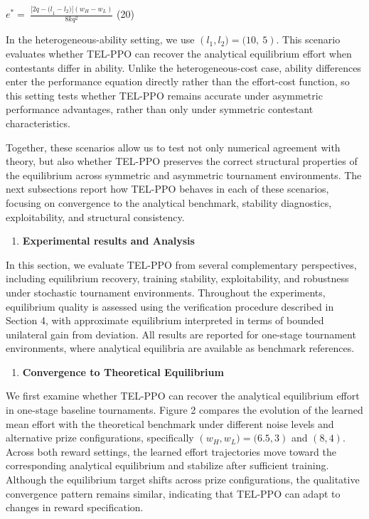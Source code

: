 \documentclass[
]{article}
\begin{document}
\(e^{*} = \ \frac{\lbrack 2q - {(l}_{1} - l_{2})\rbrack(w_{H} - w_{L})}{8kq^{2}}\)
(20)

In the heterogeneous-ability setting, we use
\(\left( l_{1},l_{2}) = (10,\ 5 \right).\) This scenario evaluates
whether TEL-PPO can recover the analytical equilibrium effort when
contestants differ in ability. Unlike the heterogeneous-cost case,
ability differences enter the performance equation directly rather than
the effort-cost function, so this setting tests whether TEL-PPO remains
accurate under asymmetric performance advantages, rather than only under
symmetric contestant characteristics.

Together, these scenarios allow us to test not only numerical agreement
with theory, but also whether TEL-PPO preserves the correct structural
properties of the equilibrium across symmetric and asymmetric tournament
environments. The next subsections report how TEL-PPO behaves in each of
these scenarios, focusing on convergence to the analytical benchmark,
stability diagnostics, exploitability, and structural consistency.

\begin{enumerate}
\def\labelenumi{\arabic{enumi}.}
\setcounter{enumi}{2}
\item
  \textbf{Experimental results and Analysis}
\end{enumerate}

In this section, we evaluate TEL-PPO from several complementary
perspectives, including equilibrium recovery, training stability,
exploitability, and robustness under stochastic tournament environments.
Throughout the experiments, equilibrium quality is assessed using the
verification procedure described in Section 4, with approximate
equilibrium interpreted in terms of bounded unilateral gain from
deviation. All results are reported for one-stage tournament
environments, where analytical equilibria are available as benchmark
references.

\begin{enumerate}
\def\labelenumi{\arabic{enumi}.}
\item
  \textbf{Convergence to Theoretical Equilibrium}
\end{enumerate}

We first examine whether TEL-PPO can recover the analytical equilibrium
effort in one-stage baseline tournaments. Figure 2 compares the
evolution of the learned mean effort with the theoretical benchmark
under different noise levels and alternative prize configurations,
specifically \(\left( w_{H},w_{L}) = (6.5,3 \right)\) and \((8,4)\).
Across both reward settings, the learned effort trajectories move toward
the corresponding analytical equilibrium and stabilize after sufficient
training. Although the equilibrium target shifts across prize
configurations, the qualitative convergence pattern remains similar,
indicating that TEL-PPO can adapt to changes in reward specification.
\end{document}
